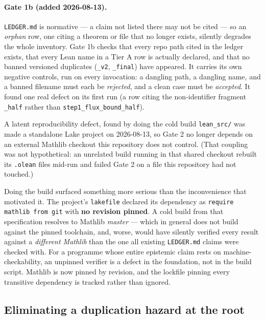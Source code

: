 \documentclass[11pt,a4paper]{article}
\theoremstyle{definition}
\theoremstyle{plain}
\begin{document}
\paragraph{Gate 1b (added 2026-08-13).} \texttt{LEDGER.md} is normative --- a claim not listed
there may not be cited --- so an \emph{orphan} row, one citing a theorem or file that no longer
exists, silently degrades the whole inventory. Gate 1b checks that every repo path cited in the
ledger exists, that every Lean name in a Tier A row is actually declared, and that no banned
versioned duplicates (\texttt{\_v2}, \texttt{\_final}) have appeared. It carries its own
negative controls, run on every invocation: a dangling path, a dangling name, and a banned
filename must each be \emph{rejected}, and a clean case must be \emph{accepted}. It found one
real defect on its first run (a row citing the non-identifier fragment \texttt{\_half} rather
than \texttt{step1\_flux\_bound\_half}).

\begin{keybox}{A latent reproducibility defect, found by doing the cold build}
\texttt{lean\_src/} was made a standalone Lake project on 2026-08-13, so Gate 2 no longer
depends on an external Mathlib checkout this repository does not control. (That coupling was
not hypothetical: an unrelated build running in that shared checkout rebuilt its \texttt{.olean}
files mid-run and failed Gate 2 on a file this repository had not touched.)

Doing the build surfaced something more serious than the inconvenience that motivated it. The
project's \texttt{lakefile} declared its dependency as \texttt{require mathlib from git} with
\textbf{no revision pinned}. A cold build from that specification resolves to Mathlib
\emph{master} --- which in general does not build against the pinned toolchain, and, worse,
would have silently verified every result against a \emph{different Mathlib} than the one all
existing \texttt{LEDGER.md} claims were checked with. For a programme whose entire epistemic
claim rests on machine-checkability, an unpinned verifier is a defect in the foundation, not in
the build script. Mathlib is now pinned by revision, and the lockfile pinning every transitive
dependency is tracked rather than ignored.
\end{keybox}

\subsection{Eliminating a duplication hazard at the root}
\end{document}
